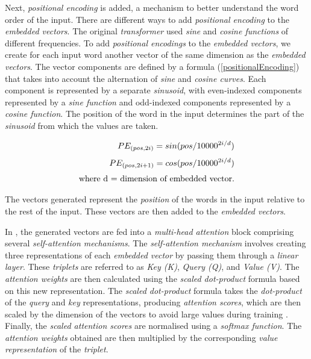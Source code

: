 \documentclass{article}
\begin{document}
Next, \textit{positional encoding} is added, a mechanism to better understand the word order of the input. There are different ways to add \textit{positional encoding} to the \textit{embedded vectors}. The original \textit{transformer} used \textit{sine} and \textit{cosine functions} of different frequencies. To add \textit{positional encodings} to the \textit{embedded vectors}, we create for each input word another vector of the same dimension as the \textit{embedded vectors}. The vector components are defined by a formula (\ref{positionalEncoding}) that takes into account the alternation of \textit{sine} and \textit{cosine curves}.  Each component is represented by a separate \textit{sinusoid}, with even-indexed components represented by a \textit{sine function} and odd-indexed components represented by a \textit{cosine function}. The position of the word in the input determines the part of the \textit{sinusoid} from which the values are taken.

\begin{align}
\begin{split}
	PE_{(pos,2i)} = sin(pos / 10000^{2i/d}) \\[0.25\baselineskip]
    PE_{(pos,2i+1)} = cos(pos / 10000^{2i/d}) \\[0.25\baselineskip]
    \text{where d = dimension of embedded vector.}
\end{split}
\label{positionalEncoding}
\end{align}

The vectors generated represent the \textit{position} of the words in the input relative to the rest of the input. These vectors are then added to the \textit{embedded vectors}.

In \cite{attentionIsAllYouNeed}, the generated vectors are fed into a \textit{multi-head attention} block comprising several \textit{self-attention mechanisms}. The \textit{self-attention mechanism} involves creating three representations of each \textit{embedded vector} by passing them through a \textit{linear layer}. These \textit{triplets} are referred to as \textit{Key (K)}, \textit{Query (Q)}, and \textit{Value (V)}. The \textit{attention weights} are then calculated using the \textit{scaled dot-product} formula based on this new representation. The \textit{scaled dot-product} formula takes the \textit{dot-product} of the \textit{query} and \textit{key} representations, producing \textit{attention scores}, which are then scaled by the dimension of the vectors to avoid large values during training \cite[pp.~62ff]{huggingface}.  Finally, the \textit{scaled attention scores} are normalised using a \textit{softmax function}. The \textit{attention weights} obtained are then multiplied by the corresponding \textit{value representation} of the \textit{triplet}.
\end{document}
